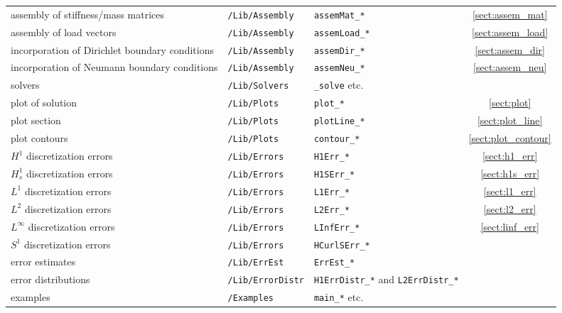 \begin{tabular}{p{4cm}|p{3.3cm}|p{2.9cm}|c}
	assembly of stiffness/mass matrices & {\tt /Lib/Assembly} & {\tt assemMat\_*} & \ref{sect:assem_mat} \\
	assembly of load vectors & {\tt /Lib/Assembly} & {\tt assemLoad\_*} & \ref{sect:assem_load} \\ \hline

	incorporation of Dirichlet boundary conditions & {\tt /Lib/Assembly} & {\tt assemDir\_*} & \ref{sect:assem_dir}\\
	incorporation of Neumann boundary conditions & {\tt /Lib/Assembly} & {\tt assemNeu\_*} & \ref{sect:assem_neu}\\ \hline

	solvers & {\tt /Lib/Solvers} & {\tt *\_solve} etc. & \\ \hline

	plot of solution & {\tt /Lib/Plots} & {\tt plot\_*} & \ref{sect:plot} \\
	plot section & {\tt /Lib/Plots} & {\tt plotLine\_*} & \ref{sect:plot_line} \\
	plot contours & {\tt /Lib/Plots} & {\tt contour\_*} & \ref{sect:plot_contour} \\ \hline

	$H^1$ discretization errors & {\tt /Lib/Errors} & {\tt H1Err\_*} & \ref{sect:h1_err} \\
	$H^1_s$ discretization errors & {\tt /Lib/Errors} & {\tt H1SErr\_*} & \ref{sect:h1s_err} \\
	$L^1$ discretization errors & {\tt /Lib/Errors} & {\tt L1Err\_*} & \ref{sect:l1_err} \\
	$L^2$ discretization errors & {\tt /Lib/Errors} & {\tt L2Err\_*} & \ref{sect:l2_err} \\
	$L^{\infty}$ discretization errors & {\tt /Lib/Errors} & {\tt LInfErr\_*} & \ref{sect:linf_err} \\ 
	$S^1$ discretization errors & {\tt /Lib/Errors} & {\tt HCurlSErr\_*} &  \\ \hline

	error estimates & {\tt /Lib/ErrEst} & {\tt ErrEst\_*} & \\ 
	error distributions & {\tt /Lib/ErrorDistr} & {\tt H1ErrDistr\_*} and {\tt L2ErrDistr\_*} & \\ \hline

	examples & {\tt /Examples} & {\tt main\_*} etc. &
\end{tabular} \\